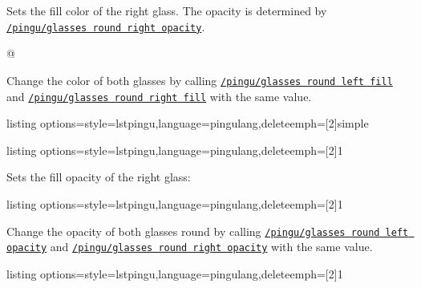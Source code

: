 \documentclass[parskip=half,english,numbers=noenddot,footnotes=nomultiple,oneside]{scrartcl}
\def\lpingu#1{\lstinline[style=lstpingu,language=pingulang]'#1'}
\newcommand*\keyref[2][/pingu/]{\hyperref[pk:#1#2]{\lpingu{#1#2}}}
\begin{document}
	Sets the fill color of the right glass. The opacity is determined by \keyref{glasses round right opacity}.
\begin{tcblisting}{@}
\begin{tikzpicture}
	\pingu[glasses round,
		  glasses round right fill=green]
\end{tikzpicture}
\end{tcblisting}
\endsubkeyexplain

	Change the color of both glasses by calling \keyref{glasses round left fill} and \keyref{glasses round right fill} with the same value.
\begin{tcblisting}{listing options={style=lstpingu,language=pingulang,deleteemph={[2]{simple}}}}
\begin{tikzpicture}
	\pingu[glasses round, glasses round fill=green]
\end{tikzpicture}
\end{tcblisting}
\endsubkeyexplain

\begin{tcblisting}{listing options={style=lstpingu,language=pingulang,deleteemph={[2]{1}}}}
\begin{tikzpicture}
	\pingu[glasses round,
			 glasses round left fill=green,
			 glasses round left opacity=1]
\end{tikzpicture}
\end{tcblisting}
\endsubkeyexplain

	Sets the fill opacity of the right glass:
\begin{tcblisting}{listing options={style=lstpingu,language=pingulang,deleteemph={[2]{1}}}}
\begin{tikzpicture}
	\pingu[glasses round,
			 glasses round right fill=green,
			 glasses round right opacity=1]
\end{tikzpicture}
\end{tcblisting}
\endsubkeyexplain

	Change the opacity of both glasses round by calling \keyref{glasses round left opacity} and \keyref{glasses round right opacity} with the same value.
\begin{tcblisting}{listing options={style=lstpingu,language=pingulang,deleteemph={[2]{1}}}}
\begin{tikzpicture}
	\pingu[glasses round,
		glasses round fill=teal,
		glasses round opacity=1]
\end{tikzpicture}
\end{tcblisting}
\endsubkeyexplain
\end{document}
